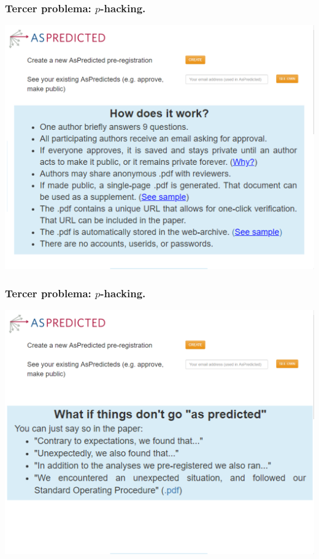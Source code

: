 \documentclass[9pt]{beamer}
\begin{document}
\begin{frame}
  \frametitle{Tercer problema: $p$-hacking.}
    \hspace*{-0.5cm}\includegraphics[height=1.0\textheight]{images/aspredicted_web-2}
\end{frame}
\begin{frame}
  \frametitle{Tercer problema: $p$-hacking.}
    \hspace*{-0.5cm}\includegraphics[height=1.0\textheight]{images/aspredicted_web-3}
\end{frame}
\end{document}
